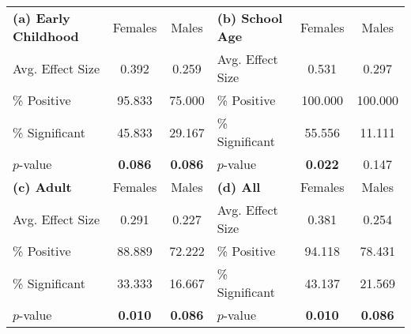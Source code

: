 
\begin{tabular}{lcc|lcc} 
\toprule
 \textbf{(a) Early Childhood} & Females & Males & \textbf{(b) School Age}  & Females & Males \\
 \cmidrule(lr){2-3} \cmidrule(lr){5-6}
\quad Avg. Effect Size &     0.392 &     0.259 				&  \quad Avg. Effect Size &     0.531 &     0.297 \\  
\quad \% Positive &    95.833 &    75.000 				&	  \quad \% Positive &   100.000 &   100.000 \\  
\quad \% Significant &    45.833 &    29.167 			& \quad \% Significant &    55.556 &    11.111 \\  
\quad $p$-value &     \textbf{0.086} &     \textbf{0.086} 	&  \quad $p$-value &     \textbf{0.022} &     0.147 \\  
 \midrule
  \textbf{(c) Adult} &Females & Males  & \textbf{(d) All}  &Females & Males  \\
   \cmidrule(lr){2-3} \cmidrule(lr){5-6}
\quad Avg. Effect Size &     0.291 &     0.227 						& \quad Avg. Effect Size&     0.381 &     0.254 \\  
\quad \% Positive &    88.889 &    72.222 				&  \quad \% Positive &    94.118 &    78.431 \\  
\quad \% Significant &    33.333 &    16.667 			&  \quad \% Significant &    43.137 &    21.569 \\  
\quad $p$-value &     \textbf{0.010} &     \textbf{0.086} 	&  \quad $p$-value &     \textbf{0.010} &     \textbf{0.086} \\  
\bottomrule
\end{tabular}


